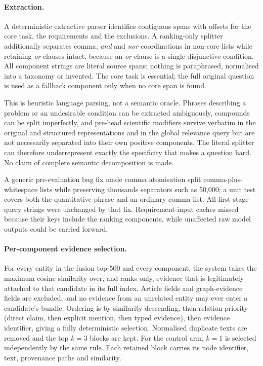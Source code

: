 \documentclass[11pt,a4paper]{article}
\begin{document}
\paragraph{Extraction.} A deterministic extractive parser identifies contiguous spans with offsets for the core task, the requirements and the exclusions. A ranking-only splitter additionally separates comma, \emph{and} and \emph{nor} coordinations in non-core lists while retaining \emph{or} clauses intact, because an \emph{or} clause is a single disjunctive condition. All component strings are literal source spans; nothing is paraphrased, normalised into a taxonomy or invented. The core task is essential; the full original question is used as a fallback component only when no core span is found.

This is heuristic language parsing, not a semantic oracle. Phrases describing a problem or an undesirable condition can be extracted ambiguously, compounds can be split imperfectly, and pre-head scientific modifiers survive verbatim in the original and structured representations and in the global relevance query but are not necessarily separated into their own positive components. The literal splitter can therefore underrepresent exactly the specificity that makes a question hard. No claim of complete semantic decomposition is made.

A generic pre-evaluation bug fix made comma atomisation split comma-plus-whitespace lists while preserving thousands separators such as 50,000; a unit test covers both the quantitative phrase and an ordinary comma list. All first-stage query strings were unchanged by that fix. Requirement-input caches missed because their keys include the ranking components, while unaffected raw model outputs could be carried forward.

\paragraph{Per-component evidence selection.} For every entity in the fusion top-500 and every component, the system takes the maximum cosine similarity over, and ranks only, evidence that is legitimately attached to that candidate in its full index. Article fields and graph-evidence fields are excluded, and no evidence from an unrelated entity may ever enter a candidate's bundle. Ordering is by similarity descending, then relation priority (direct claim, then explicit mention, then typed evidence), then evidence identifier, giving a fully deterministic selection. Normalised duplicate texts are removed and the top $k=3$ blocks are kept. For the control arm, $k=1$ is selected independently by the same rule. Each retained block carries its node identifier, text, provenance paths and similarity.
\end{document}
